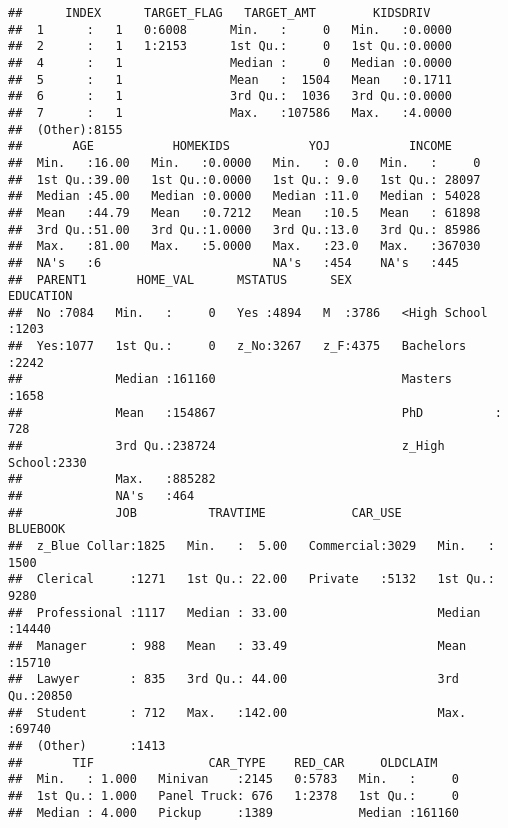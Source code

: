 \documentclass[]{article}
\begin{document}
\begin{verbatim}
##      INDEX      TARGET_FLAG   TARGET_AMT        KIDSDRIV     
##  1      :   1   0:6008      Min.   :     0   Min.   :0.0000  
##  2      :   1   1:2153      1st Qu.:     0   1st Qu.:0.0000  
##  4      :   1               Median :     0   Median :0.0000  
##  5      :   1               Mean   :  1504   Mean   :0.1711  
##  6      :   1               3rd Qu.:  1036   3rd Qu.:0.0000  
##  7      :   1               Max.   :107586   Max.   :4.0000  
##  (Other):8155                                                
##       AGE           HOMEKIDS           YOJ           INCOME      
##  Min.   :16.00   Min.   :0.0000   Min.   : 0.0   Min.   :     0  
##  1st Qu.:39.00   1st Qu.:0.0000   1st Qu.: 9.0   1st Qu.: 28097  
##  Median :45.00   Median :0.0000   Median :11.0   Median : 54028  
##  Mean   :44.79   Mean   :0.7212   Mean   :10.5   Mean   : 61898  
##  3rd Qu.:51.00   3rd Qu.:1.0000   3rd Qu.:13.0   3rd Qu.: 85986  
##  Max.   :81.00   Max.   :5.0000   Max.   :23.0   Max.   :367030  
##  NA's   :6                        NA's   :454    NA's   :445     
##  PARENT1       HOME_VAL      MSTATUS      SEX               EDUCATION   
##  No :7084   Min.   :     0   Yes :4894   M  :3786   <High School :1203  
##  Yes:1077   1st Qu.:     0   z_No:3267   z_F:4375   Bachelors    :2242  
##             Median :161160                          Masters      :1658  
##             Mean   :154867                          PhD          : 728  
##             3rd Qu.:238724                          z_High School:2330  
##             Max.   :885282                                              
##             NA's   :464                                                 
##             JOB          TRAVTIME            CAR_USE        BLUEBOOK    
##  z_Blue Collar:1825   Min.   :  5.00   Commercial:3029   Min.   : 1500  
##  Clerical     :1271   1st Qu.: 22.00   Private   :5132   1st Qu.: 9280  
##  Professional :1117   Median : 33.00                     Median :14440  
##  Manager      : 988   Mean   : 33.49                     Mean   :15710  
##  Lawyer       : 835   3rd Qu.: 44.00                     3rd Qu.:20850  
##  Student      : 712   Max.   :142.00                     Max.   :69740  
##  (Other)      :1413                                                     
##       TIF                CAR_TYPE    RED_CAR     OLDCLAIM     
##  Min.   : 1.000   Minivan    :2145   0:5783   Min.   :     0  
##  1st Qu.: 1.000   Panel Truck: 676   1:2378   1st Qu.:     0  
##  Median : 4.000   Pickup     :1389            Median :161160  

\end{verbatim}
\end{document}
